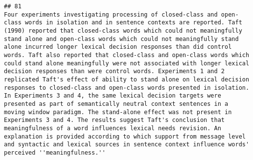 \documentclass[
  english,
  man]{apa6}
\begin{document}
\begin{verbatim}
## 81                                                                                                                                                                                                                                                                                                                                                                                                                                                                                                                                                                                                                                                                                                                                                                                                                                                                                                                                                                                                                                                                                                                                                                                                                                                                                                                                                                                                                                                Four experiments investigating processing of closed-class and open-class words in isolation and in sentence contexts are reported. Taft (1990) reported that closed-class words which could not meaningfully stand alone and open-class words which could not meaningfully stand alone incurred longer lexical decision responses than did control words. Taft also reported that closed-class and open-class words which could stand alone meaningfully were not associated with longer lexical decision responses than were control words. Experiments 1 and 2 replicated Taft's effect of ability to stand alone on lexical decision responses to closed-class and open-class words presented in isolation. In Experiments 3 and 4, the same lexical decision targets were presented as part of semantically neutral context sentences in a moving window paradigm. The stand-alone effect was not present in Experiments 3 and 4. The results suggest Taft's conclusion that meaningfulness of a word influences lexical needs revision. An explanation is provided according to which support from message level and syntactic and lexical sources in sentence context influence words' perceived ''meaningfulness.''

\end{verbatim}
\end{document}
